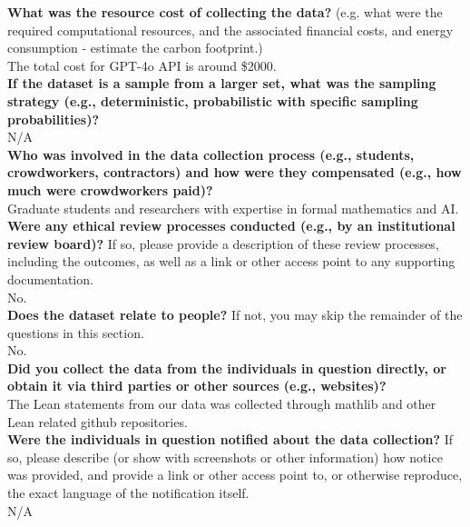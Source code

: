     \textcolor{\sectioncolor}{\textbf{What was the resource cost of collecting the data?
    }
    (e.g. what were the required computational resources, and the associated
    financial costs, and energy consumption - estimate the carbon footprint.)} \\
    The total cost for GPT-4o API is around \$2000.
    \\
    
    \textcolor{\sectioncolor}{\textbf{If the dataset is a sample from a larger set, what was the sampling
    strategy (e.g., deterministic, probabilistic with specific sampling
    probabilities)?
    }
    } \\
    N/A \\
    
    \textcolor{\sectioncolor}{\textbf{Who was involved in the data collection process (e.g., students,
    crowdworkers, contractors) and how were they compensated (e.g., how much
    were crowdworkers paid)?
    }
    } \\
    Graduate students and researchers with expertise in formal mathematics and AI. \\
    
    \textcolor{\sectioncolor}{\textbf{Were any ethical review processes conducted (e.g., by an institutional
    review board)?
    }
    If so, please provide a description of these review processes, including
    the outcomes, as well as a link or other access point to any supporting
    documentation.
    } \\
    No. \\
    
    \textcolor{\sectioncolor}{\textbf{Does the dataset relate to people?
    }
    If not, you may skip the remainder of the questions in this section.
    } \\
    No. \\
    
    \textcolor{\sectioncolor}{\textbf{Did you collect the data from the individuals in question directly, or
    obtain it via third parties or other sources (e.g., websites)?
    }
    } \\
    The Lean statements from our data was collected through mathlib and other Lean related github repositories.\\
    
    \textcolor{\sectioncolor}{\textbf{Were the individuals in question notified about the data collection?
    }
    If so, please describe (or show with screenshots or other information) how
    notice was provided, and provide a link or other access point to, or
    otherwise reproduce, the exact language of the notification itself.
    } \\
    N/A \\
    
